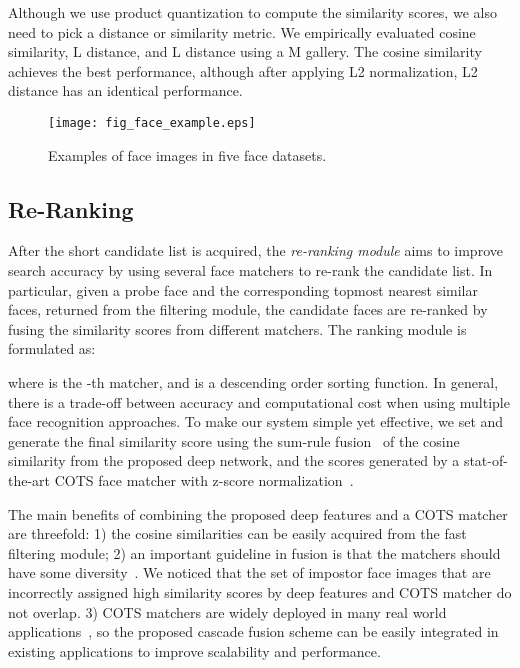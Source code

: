 \documentclass[10pt,journal,compsoc]{IEEEtran}
\begin{document}
Although we use product quantization to compute the similarity scores, we also need to pick a distance or similarity metric. We empirically evaluated cosine similarity, L distance, and L distance using a M gallery. The cosine similarity achieves the best performance, although after applying L2 normalization, L2 distance has an identical performance.

\begin{figure*}[htbp]
\centering
  \texttt{[image: fig\_face\_example.eps]}\\
  \caption{Examples of face images in five face datasets.}\label{fig:example_web}
\end{figure*}

\subsection{Re-Ranking}
After the short candidate list is acquired, the \emph{re-ranking module} aims to improve search accuracy by using several face matchers to re-rank the candidate list. In particular, given a probe face  and the corresponding  topmost nearest similar faces,  returned from the filtering module, the  candidate faces are re-ranked by fusing the similarity scores from  different matchers. The ranking module is formulated as:

\noindent where  is the -th matcher, and  is a descending order sorting function. In general, there is a trade-off between accuracy and computational cost when using multiple face recognition approaches. To make our system simple yet effective, we set  and generate the final similarity score using the sum-rule fusion~\cite{fusion:occ} of the cosine similarity from the proposed deep network, and the scores generated by a stat-of-the-art COTS face matcher with z-score normalization~\cite{zscore}.

The main benefits of combining the proposed deep features and a COTS matcher are threefold:
1) the cosine similarities can be easily acquired from the fast filtering module;
2) an important guideline in fusion is that the matchers should have some diversity~\cite{fusion:occ, fusion:rule}. We noticed that the set of impostor face images that are incorrectly assigned high similarity scores by deep features and COTS matcher do not overlap.
3) COTS matchers are widely deployed in many real world applications~\cite{fvrt:2014}, so the proposed cascade fusion scheme can be easily integrated in existing applications to improve scalability and performance.
\end{document}
